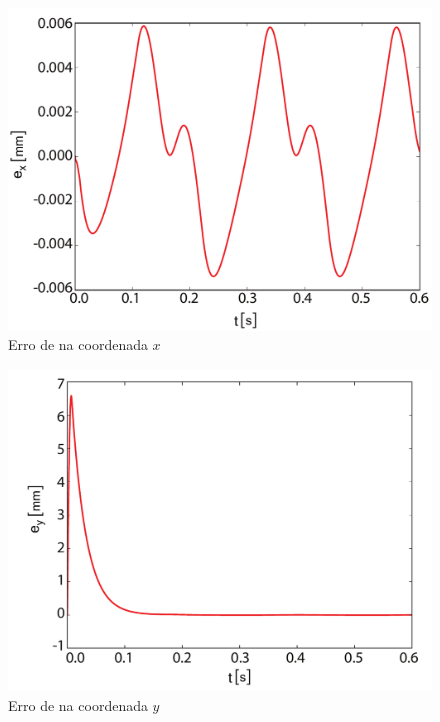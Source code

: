 \documentclass[]{politex}
\begin{document}
\begin{multicols}{2}
\begin{figure}[H]
	\centering
	\includegraphics[scale=0.31]{../figures/ex.pdf}  
	\caption{Erro de na coordenada $x$}
	\label{fig:ex}
\end{figure}

\begin{figure}[H]
	\centering
	\includegraphics[scale=0.31]{../figures/ey.pdf}  
	\caption{Erro de na coordenada $y$}
	\label{fig:ey}
\end{figure}
\end{multicols}
\end{document}
